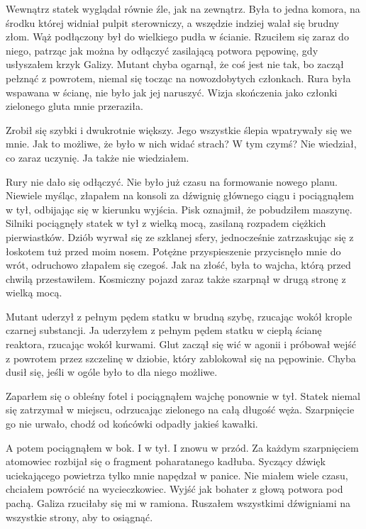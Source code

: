 Wewnątrz statek wyglądał równie źle, jak na zewnątrz.
Była to jedna komora, na środku której widniał pulpit sterowniczy, a wszędzie indziej walał się brudny złom.
Wąż podłączony był do wielkiego pudła w ścianie.
Rzuciłem się zaraz do niego, patrząc jak można by odłączyć zasilającą potwora pępowinę, gdy usłyszałem krzyk Galizy.
Mutant chyba ogarnął, że coś jest nie tak, bo zaczął pełznąć z powrotem, niemal się tocząc na nowozdobytych członkach.
Rura była wspawana w ścianę, nie było jak jej naruszyć. Wizja skończenia jako członki zielonego gluta mnie przeraziła.

Zrobił się szybki i dwukrotnie większy.
Jego wszystkie ślepia wpatrywały się we mnie.
Jak to możliwe, że było w nich widać strach? W tym czymś?
Nie wiedział, co zaraz uczynię. Ja także nie wiedziałem.

Rury nie dało się odłączyć. Nie było już czasu na formowanie nowego planu.
Niewiele myśląc, złapałem na konsoli za dźwignię głównego ciągu i pociągnąłem w tył, odbijając się w kierunku wyjścia.
Pisk oznajmił, że pobudziłem maszynę. Silniki pociągnęły statek w tył z wielką mocą, zasilaną rozpadem ciężkich pierwiastków.
Dziób wyrwał się ze szklanej sfery, jednocześnie zatrzaskując się z łoskotem tuż przed moim nosem.
Potężne przyspieszenie przycisnęło mnie do wrót, odruchowo złapałem się czegoś. 
Jak na złość, była to wajcha, którą przed chwilą przestawiłem.
Kosmiczny pojazd zaraz także szarpnął w drugą stronę z wielką mocą.

Mutant uderzył z pełnym pędem statku w brudną szybę, rzucając wokół krople czarnej substancji.
Ja uderzyłem z pełnym pędem statku w ciepłą ścianę reaktora, rzucając wokół kurwami.
Glut zaczął się wić w agonii i próbował wejść z powrotem przez szczelinę w dziobie, który zablokował się na pępowinie.
Chyba dusił się, jeśli w ogóle było to dla niego możliwe.

Zaparłem się o obleśny fotel i pociągnąłem wajchę ponownie w tył. Statek niemal się zatrzymał w miejscu, odrzucając zielonego na całą długość węża.
Szarpnięcie go nie urwało, chodź od końcówki odpadły jakieś kawałki.

A potem pociągnąłem w bok. I w tył. I znowu w przód.
Za każdym szarpnięciem atomowiec rozbijał się o fragment poharatanego kadłuba.
Syczący dźwięk uciekającego powietrza tylko mnie napędzał w panice.
Nie miałem wiele czasu, chciałem powrócić na wycieczkowiec.
Wyjść jak bohater z głową potwora pod pachą.
Galiza rzuciłaby się mi w ramiona.
Ruszałem wszystkimi dźwigniami na wszystkie strony, aby to osiągnąć.

